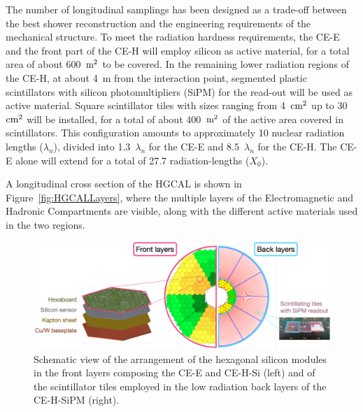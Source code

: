 The number of longitudinal samplings has been designed as a trade-off between the best shower reconstruction and the engineering requirements of the mechanical structure. 
To meet the radiation hardness requirements, the CE-E and the front part of the CE-H will employ silicon as active material, for a total area of about 600~$\textnormal{m}^2$ to be covered. 
In the remaining lower radiation regions of the CE-H, at about 4~m from the interaction point, segmented plastic scintillators with silicon photomultipliers (SiPM) for the read-out will be used as active material. 
Square scintillator tiles with sizes ranging from 4~$\textnormal{cm}^2$ up to 30~$\textnormal{cm}^2$ will be installed, for a total of about 400~$\textnormal{m}^2$ of the active area covered in scintillators.
This configuration amounts to approximately 10 nuclear radiation lengths ($\lambda_n$), divided into 1.3~$\lambda_n$ for the CE-E and 8.5~$\lambda_n$ for the CE-H. The CE-E alone will extend for a total of 27.7 radiation-lengths ($X_0$).

A longitudinal cross section of the HGCAL is shown in Figure~\ref{fig:HGCALLayers}, where the multiple layers of the Electromagnetic and Hadronic Compartments are visible, along with the different active materials used in the two regions.

\bigbreak

\begin{figure}
    \centering
    \includegraphics[width=0.9\linewidth]{Figures/HGCAL/FrontBackLayers.pdf}
    \caption{Schematic view of the arrangement of the hexagonal silicon modules in the front layers composing the CE-E and CE-H-Si (left) and of the scintillator tiles employed in the low radiation back layers of the CE-H-SiPM (right).}
    \label{fig:FrontBackLayers}
\end{figure}

